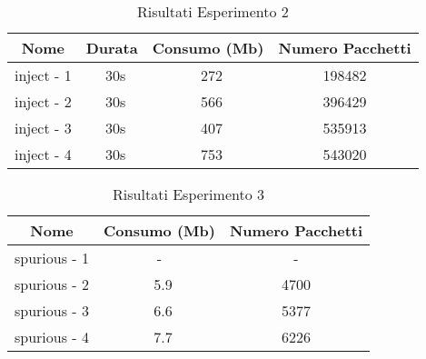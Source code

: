 \begin{table}[h!]
    \centering
    \caption*{Risultati Esperimento 2}
    \begin{tabular}{|c|c|c|c|}
        \hline
        \textbf{Nome} & \textbf{Durata} & \textbf{Consumo (Mb)} & \textbf{Numero Pacchetti} \\
        \hline
        inject - 1 & ~30s & ~272 & 198482 \\
        \hline
        inject - 2 & ~30s & ~566 & 396429 \\
        \hline
        inject - 3 & ~30s & ~407 & 535913 \\
        \hline
        inject - 4 & ~30s & ~753 & 543020 \\
        \hline
    \end{tabular}
\end{table}

\begin{table}[h!]
    \centering
    \caption*{Risultati Esperimento 3}
    \begin{tabular}{|c|c|c|}
        \hline
        \textbf{Nome} & \textbf{Consumo (Mb)} & \textbf{Numero Pacchetti} \\
        \hline
        spurious - 1 & - & - \\
        \hline
        spurious - 2 & ~5.9 & 4700 \\
        \hline
        spurious - 3 & ~6.6 & 5377 \\
        \hline
        spurious - 4 & ~7.7 & 6226 \\
        \hline
    \end{tabular}
\end{table}

